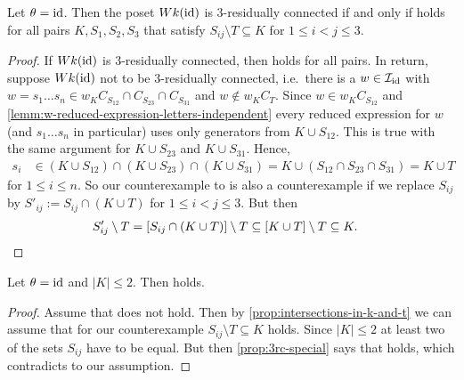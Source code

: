 \begin{prop}
	Let $\theta = \operatorname{id}$. Then the poset $Wk(\operatorname{id})$ is 3-residually connected if and only if  holds for all pairs $K,S_1,S_2,S_3$ that satisfy $S_{ij} \setminus T \subseteq K$ for $1 \leq i < j \leq 3$.

	\begin{proof}
		If $Wk(\operatorname{id})$ is 3-residually connected, then  holds for all pairs. In return, suppose $Wk(\operatorname{id})$ not to be 3-residually connected, i.e.\ there is a $w \in \mathcal{I}_{\operatorname{id}}$ with $w = s_1 \ldots s_n \in w_K C_{S_{12}} \cap C_{S_{23}} \cap C_{S_{31}}$ and $w \notin w_K C_T$. Since $w \in w_K C_{S_{12}}$ and \ref{lemm:w-reduced-expression-letters-independent} every reduced expression for $w$ (and $s_1 \ldots s_n$ in particular) uses only generators from $K \cup S_{12}$. This is true with the same argument for $K \cup S_{23}$ and $K \cup S_{31}$. Hence,
		\begin{align*}
			s_i	& \in (K \cup S_{12}) \cap (K \cup S_{23}) \cap (K \cup S_{31}) = K \cup (S_{12} \cap S_{23} \cap S_{31}) = K \cup T
		\end{align*}
		for $1 \leq i \leq n$. So our counterexample to  is also a counterexample if we replace $S_{ij}$ by $S'_{ij} := S_{ij} \cap (K \cup T)$ for $1 \leq i < j \leq 3$. But then
		\begin{align*}
			S'_{ij} \setminus T & = [S_{ij} \cap (K \cup T)] \setminus T \subseteq [K \cup T] \setminus T \subseteq K. \qedhere
		\end{align*}
	\end{proof}
\end{prop}

\begin{coro}
	Let $\theta = \operatorname{id}$ and $|K| \leq 2$. Then  holds.

	\begin{proof}
		Assume that  does not hold. Then by \ref{prop:intersections-in-k-and-t} we can assume that for our counterexample $S_{ij} \setminus T \subseteq K$ holds. Since $|K| \leq 2$ at least two of the sets $S_{ij}$ have to be equal. But then \ref{prop:3rc-special} says that  holds, which contradicts to our assumption.
	\end{proof}
\end{coro}